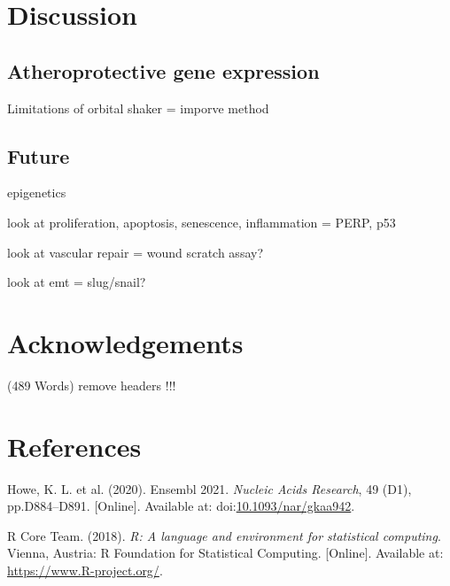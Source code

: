\documentclass[
  12pt,
]{article}
\newlength{\cslhangindent}
\newlength{\cslentryspacingunit} %
\newenvironment{CSLReferences}[2] %
 {%
  \setlength{\parindent}{0pt}
  \ifodd #1
  \let\oldpar\par
  \def\par{\hangindent=\cslhangindent\oldpar}
  \fi
  \setlength{\parskip}{#2\cslentryspacingunit}
 }%
 {}
\begin{document}
\hypertarget{discussion}{%
\section{Discussion}\label{discussion}}

\hypertarget{atheroprotective-gene-expression}{%
\subsection{Atheroprotective gene expression}\label{atheroprotective-gene-expression}}

Limitations of orbital shaker = imporve method

\hypertarget{future}{%
\subsection{Future}\label{future}}

epigenetics

look at proliferation, apoptosis, senescence, inflammation = PERP, p53

look at vascular repair = wound scratch assay?

look at emt = slug/snail?

\hypertarget{acknowledgements}{%
\section{Acknowledgements}\label{acknowledgements}}

\begin{flushright}
(489 Words) remove headers !!!
\end{flushright}

\hypertarget{references}{%
\section{References}\label{references}}

\hypertarget{refs}{}
\begin{CSLReferences}{0}{0}
\leavevmode{}%
Howe, K. L. {et al.} (2020). {Ensembl 2021}. \emph{Nucleic Acids Research}, 49 (D1), pp.D884--D891. {[}Online{]}. Available at: doi:\href{https://doi.org/10.1093/nar/gkaa942}{10.1093/nar/gkaa942}.

\leavevmode{}%
R Core Team. (2018). {\emph{R: A language and environment for statistical computing}}. Vienna, Austria: R Foundation for Statistical Computing. {[}Online{]}. Available at: \url{https://www.R-project.org/}.

\end{CSLReferences}
\end{document}
